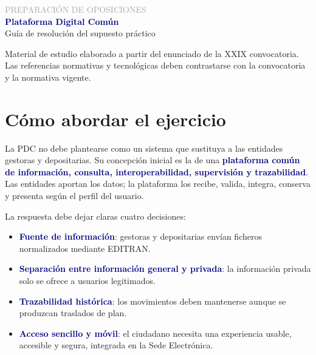 \documentclass[11pt,a4paper]{article}
\newcommand{\key}[1]{\textbf{\textcolor{navy}{#1}}}
\begin{document}
\begin{titlepage}
\centering\vspace*{2cm}
{\Large\textcolor{darkgray}{PREPARACIÓN DE OPOSICIONES}}\\[1.2cm]
{\Huge\bfseries\textcolor{navy}{Plataforma Digital Común}}\\[1cm]
{\Large Guía de resolución del supuesto práctico}\\[2cm]
\vfill
\begin{minipage}{0.82\textwidth}\small\centering
Material de estudio elaborado a partir del enunciado de la XXIX convocatoria.\\
Las referencias normativas y tecnológicas deben contrastarse con la convocatoria y la normativa vigente.
\end{minipage}\vspace{1cm}
\end{titlepage}

\tableofcontents\newpage

\section{Cómo abordar el ejercicio}

La PDC no debe plantearse como un sistema que sustituya a las entidades gestoras y depositarias. Su concepción inicial es la de una \key{plataforma común de información, consulta, interoperabilidad, supervisión y trazabilidad}. Las entidades aportan los datos; la plataforma los recibe, valida, integra, conserva y presenta según el perfil del usuario.

La respuesta debe dejar claras cuatro decisiones:
\begin{itemize}
\item \key{Fuente de información}: gestoras y depositarias envían ficheros normalizados mediante EDITRAN.
\item \key{Separación entre información general y privada}: la información privada solo se ofrece a usuarios legitimados.
\item \key{Trazabilidad histórica}: los movimientos deben mantenerse aunque se produzcan traslados de plan.
\item \key{Acceso sencillo y móvil}: el ciudadano necesita una experiencia usable, accesible y segura, integrada en la Sede Electrónica.
\end{itemize}
\end{document}
